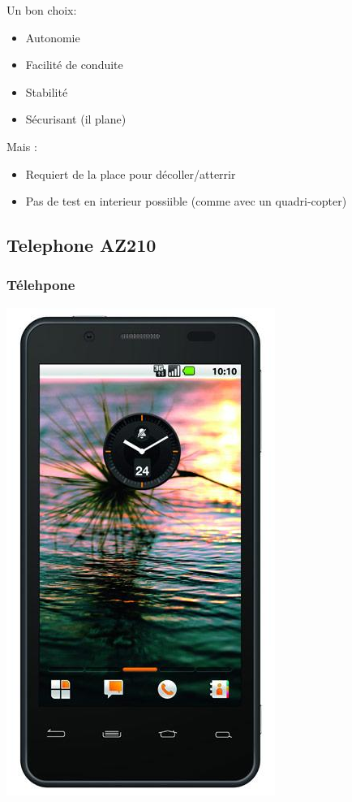 \documentclass[transparent]{beamer}
\begin{document}
\begin{frame}
	\begin{block}{Un bon choix:}
			\begin{itemize}
				\item Autonomie
				\item Facilité de conduite
				\item Stabilité
				\item Sécurisant (il plane)
			\end{itemize}
	\end{block}
	\begin{block}{Mais :}
			\begin{itemize}
				\item Requiert de la place pour décoller/atterrir
				\item Pas de test en interieur possiible (comme avec un quadri-copter)
			\end{itemize}
	\end{block}
\end{frame}


\subsection{Telephone AZ210}

\begin{frame}
	\frametitle{Télehpone}
	\begin{center}
 	\includegraphics[height=0.8\textheight]{images/telephone.png} 
	\end{center}

\end{frame}
\end{document}
